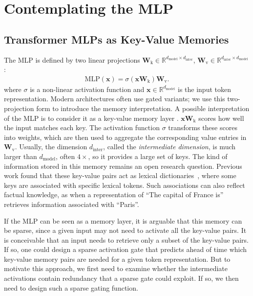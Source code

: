 \section{Contemplating the MLP}\label{sec:zon-memory}
\subsection{Transformer MLPs as Key-Value Memories}
The MLP is defined by two linear
projections $\textbf{W}_{\text{k}} \in \mathbb{R}^{d_{\text{model}} \times d_{\text{inter}}}$, $\textbf{W}_{\text{v}} \in \mathbb{R}^{d_{\text{inter}} \times d_{\text{model}}}$:
\begin{align}
    \text{MLP}(\mathbf{x}) = \sigma(\mathbf{x} \textbf{W}_{\text{k}}) \textbf{W}_{\text{v}}.
\end{align}
where $\sigma$ is a non-linear activation function and $\mathbf{x} \in \mathbb{R}^{d_{\text{model}}}$ is the input token representation.
Modern architectures often use gated variants; we use this two-projection form to introduce the memory interpretation.
A possible interpretation of the MLP is to consider it as a key-value memory layer
\citep{geva-etal-2021-transformer,dai-etal-2022-knowledge,meng2023locatingeditingfactualassociations}.
$\mathbf{x}\textbf{W}_{\text{k}}$ scores how well the input matches each key.
The activation function \(\sigma\) transforms these scores into weights,
which are then used to aggregate the corresponding value entries in \(\mathbf{W}_{\mathrm{v}}\).
Usually, the dimension $d_{\text{inter}}$, called the \textit{intermediate dimension},
is much larger than $d_{\text{model}}$, often $4\times$, so it provides a large set of keys.
The kind of information stored in this memory remains an open research question.
Previous work found that these key-value pairs act as lexical dictionaries~\citep{geva-etal-2021-transformer},
where some keys are associated with specific lexical tokens.
Such associations can also reflect factual knowledge, as when a representation of ``The capital of France is'' retrieves information associated with ``Paris''.

If the MLP can be seen as a memory layer, it is arguable that this memory can be sparse,
since a given input may not need to activate all the key-value pairs.
It is conceivable that an input needs to retrieve only a subset of the key-value pairs.
If so, one could design a sparse activation gate that predicts ahead of time
which key-value memory pairs are needed for a given token representation.
But to motivate this approach, we first need to examine whether the intermediate activations contain redundancy
that a sparse gate could exploit. If so, we then need to design such a sparse gating function.

